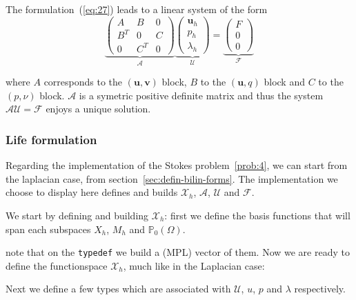 \documentclass[a4paper]{book}
\begin{document}
The formulation~(\ref{eq:27}) leads to a linear system of the form
\begin{equation}
  \label{eq:28}
  \underbrace{\begin{pmatrix}
    A & B & 0\\
    B^T & 0 & C\\
    0 & C^T & 0
  \end{pmatrix}}_{\mathcal{A}}
\underbrace{
  \begin{pmatrix}
    \mathbf{u}_h\\
    p_h\\
    \lambda_h
  \end{pmatrix}}_{\mathcal{U}} =
\underbrace{\begin{pmatrix}
    F\\
    0\\
    0
  \end{pmatrix}}_{\mathcal{F}}
\end{equation}

where $A$ corresponds to the $(\mathbf{u},\mathbf{v})$ block, $B$ to
the $(\mathbf{u},q)$ block and $C$ to the $(p,\nu)$
block. $\mathcal{A}$ is a symetric positive definite matrix and thus
the system $\mathcal{A} \mathcal{U} = \mathcal{F}$ enjoys a unique
solution.

\subsubsection{Life formulation}
\label{sec:life-formulation}

Regarding the implementation of the Stokes problem~\ref{prob:4}, we
can start from the laplacian case, from
section~\ref{sec:defin-bilin-forms}. The implementation we choose to
display here defines and builds $\mathcal{X}_h$, $\mathcal{A}$,
$\mathcal{U}$ and $\mathcal{F}$.

We start by defining and building $\mathcal{X}_h$: first we define the
basis functions that will span each subspaces $X_h$, $M_h$ and
$\mathbb{P}_0(\Omega)$.



note that on the \lstinline!typedef! we build a (MPL) vector of them. Now we are
ready to define the functionspace $\mathcal{X}_h$, much like in the
Laplacian case:



Next we define a few types which are associated with $\mathcal{U}$,
$u$, $p$ and $\lambda$ respectively.
\end{document}
